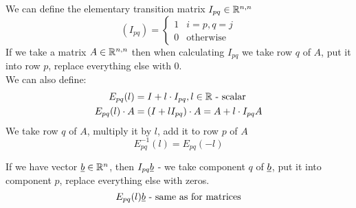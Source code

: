\begin{definition}
We can define the elementary transition matrix $I_{pq}\in\mathbb{R}^{n,n}$
\[
\left( I_{pq}\right) = \begin{cases}
1 & i=p,q=j\\
0 & \text{otherwise}
\end{cases}
\]
If we take a matrix $A\in\mathbb{R}^{n,n}$ then when calculating $I_{pq}$ we take row $q$ of $A$, put it into row $p$, replace everything else with 0.\\

We can also define:
\begin{align*}
E_{pq}(l) &= I + l\cdot I_{pq}, l\in\mathbb{R}\text{ - scalar}\\
E_{pq}(l)\cdot A &= (I+lI_{pq})\cdot A = A + l\cdot I_{pq}A
\end{align*}
We take row $q$ of $A$, multiply it by $l$, add it to row $p$ of $A$
\[
E^{-1}_{pq}(l) = E_{pq}(-l)
\]
\end{definition}
If we have vector $\underline{b}\in\mathbb{R}^n$, then $I_{pq}\underline{b}$ - we take component $q$ of $\underline{b}$, put it into component $p$, replace everything else with zeros. 
\[
E_{pq}(l)\underline{b}\text{ - same as for matrices}
\]


